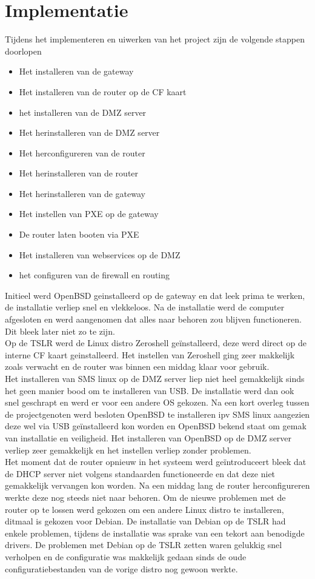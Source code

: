 \documentclass[12pt]{article}
\begin{document}
\section{Implementatie}
Tijdens het implementeren en uiwerken van het project zijn de volgende stappen doorlopen
\begin{itemize}
	\item Het installeren van de gateway
	\item Het installeren van de router op de CF kaart
	\item het installeren van de DMZ server
	\item Het herinstalleren van de DMZ server
	\item Het herconfigureren van de router
	\item Het herinstalleren van de router
	\item Het herinstalleren van de gateway
	\item Het instellen van PXE op de gateway
	\item De router laten booten via PXE
	\item Het installeren van webservices op de DMZ
	\item het configuren van de firewall en routing
\end{itemize}
Initieel werd OpenBSD geinstalleerd op de gateway en dat leek prima te werken, de installatie verliep snel en vlekkeloos. Na de installatie werd de computer afgesloten en werd aangenomen dat alles naar behoren zou blijven functioneren. Dit bleek later niet zo te zijn.
\\Op de TSLR werd de Linux distro Zeroshell ge\"installeerd, deze werd direct op de interne CF kaart geinstalleerd. Het instellen van Zeroshell ging zeer makkelijk zoals verwacht en de router was binnen een middag klaar voor gebruik.
\\Het installeren van SMS linux op de DMZ server liep niet heel gemakkelijk sinds het geen manier bood om te installeren van USB. De installatie werd dan ook snel geschrapt en werd er voor een andere OS gekozen. Na een kort overleg tussen de projectgenoten werd besloten OpenBSD te installeren ipv SMS linux aangezien deze wel via USB ge\"installeerd kon worden en OpenBSD bekend staat om gemak van installatie en veiligheid. Het installeren van OpenBSD op de DMZ server verliep zeer gemakkelijk en het instellen verliep zonder problemen.
\\Het moment dat de router opnieuw in het systeem werd ge\"introduceert bleek dat de DHCP server niet volgens standaarden functioneerde en dat deze niet gemakkelijk vervangen kon worden. Na een middag lang de router herconfigureren werkte deze nog steeds niet naar behoren. Om de nieuwe problemen met de router op te lossen werd gekozen om een andere Linux distro te installeren, ditmaal is gekozen voor Debian. De installatie van Debian op de TSLR had enkele problemen, tijdens de installatie was sprake van een tekort aan benodigde drivers. De problemen met Debian op de TSLR zetten waren gelukkig snel verholpen en de configuratie was makkelijk gedaan sinds de oude configuratiebestanden van de vorige distro nog gewoon werkte.
\end{document}
